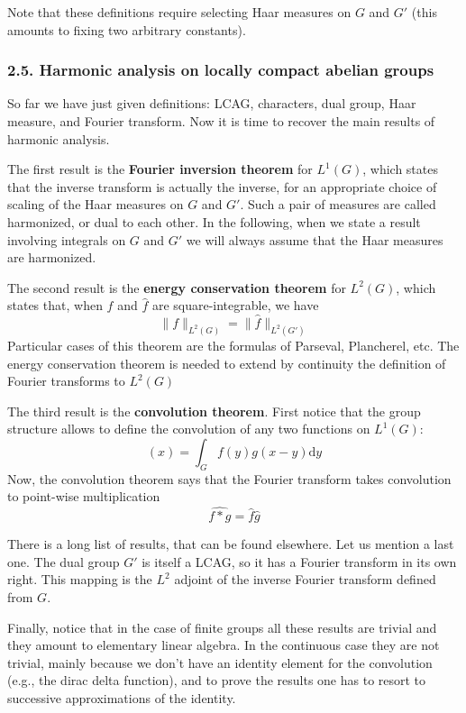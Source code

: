 Note that these definitions require selecting Haar measures on $G$
and $G'$ (this amounts to fixing two arbitrary constants).

\subsubsection{2.5. Harmonic analysis on locally compact abelian groups}

So far we have just given definitions: LCAG, characters, dual group, Haar
measure, and Fourier transform.  Now it is time to recover the main results
of harmonic analysis.

The first result is the {\bf Fourier inversion theorem} for $L^1(G)$, which
states that the inverse transform is actually the inverse, for an appropriate
choice of scaling of the Haar measures on $G$ and $G'$.  Such a pair of
measures are called harmonized, or dual to each other.  In the following,
when we state a result involving integrals on $G$ and $G'$ we will always
assume that the Haar measures are harmonized.

The second result is the {\bf energy conservation theorem} for $L^2(G)$,
which states that, when $f$ and $\hat f$ are square-integrable, we have
\begin{equation}
\|f\|_{L^2(G)}
=
\|\hat f\|_{L^2(G')}
\end{equation}
Particular cases of this theorem are the formulas of Parseval, Plancherel,
etc.
The energy conservation theorem is needed to extend by continuity the
definition of Fourier transforms to $L^2(G)$

The third result is the {\bf convolution theorem}.  First notice that the
group structure allows to define the convolution of any two functions on
$L^1(G)$:
\begin{equation}
[f*g](x) = \int_G f(y)g(x-y)\mathrm{d} y
\end{equation}
Now, the convolution theorem says that the Fourier transform takes
convolution to point-wise multiplication
\begin{equation}
\widehat{f*g} = \hat f \hat g
\end{equation}

There is a long list of results, that can be found elsewhere.  Let us mention
a last one.  The dual group $G'$ is itself a LCAG, so it has a Fourier
transform in its own right.  This mapping is the $L^2$ adjoint of the inverse
Fourier transform defined from $G$.

Finally, notice that in the case of finite groups all these results are
trivial and they amount to elementary linear algebra.  In the continuous case
they are not trivial, mainly because we don't have an identity element for
the convolution (e.g., the dirac delta function), and to prove the results
one has to resort to successive approximations of the identity.

